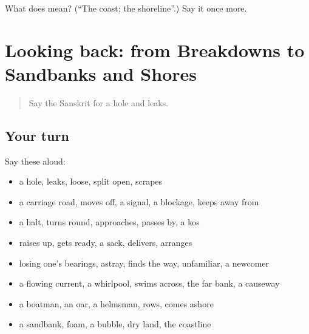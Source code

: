 \begin{tcolorbox}[breakable,colback=teal!4,colframe=teal!35!black,title={Before you move on}]
What does  mean? (\textquotedblleft{}The coast; the shoreline\textquotedblright{}.) Say it once more.
\end{tcolorbox}
\section[(dialogue)]{Looking back: from Breakdowns to Sandbanks and Shores}

\label{lesson:SA-R417-review-410-417}



\begin{quote}
Say the Sanskrit for a hole and leaks.
\end{quote}

\subsection*{Your turn}
Say these aloud:

\begin{itemize}
\raggedright
  \item a hole, leaks, loose, split open, scrapes
  \item a carriage road, moves off, a signal, a blockage, keeps away from
  \item a halt, turns round, approaches, passes by, a kos
  \item raises up, gets ready, a sack, delivers, arranges
  \item losing one's bearings, astray, finds the way, unfamiliar, a newcomer
  \item a flowing current, a whirlpool, swims across, the far bank, a causeway
  \item a boatman, an oar, a helmsman, rows, comes ashore
  \item a sandbank, foam, a bubble, dry land, the coastline
\end{itemize}

